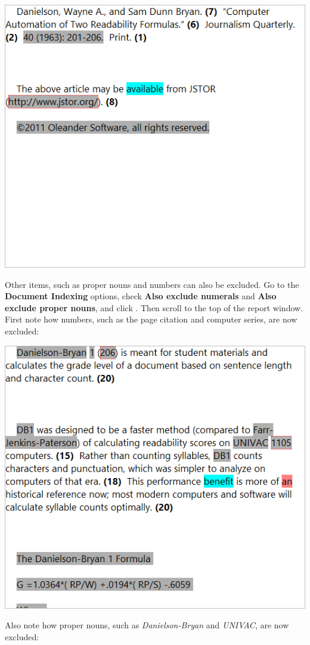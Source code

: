 \documentclass[
]{book}
\theoremstyle{definition}
\theoremstyle{definition}
\theoremstyle{definition}
\theoremstyle{definition}
\theoremstyle{remark}
\begin{document}
\begin{center}\includegraphics[width=0.75\linewidth,]{Images/ExclusionExampleUrlExcludedNow} \end{center}

Other items, such as proper nouns and numbers can also be excluded. Go to the \textbf{Document Indexing} options, check \textbf{Also exclude numerals} and \textbf{Also exclude proper nouns}, and click . Then scroll to the top of the report window. First note how numbers, such as the page citation and computer series, are now excluded:

\begin{center}\includegraphics[width=0.75\linewidth,]{Images/ExclusionExampleNumbersExcludedNow} \end{center}

Also note how proper nouns, such as \emph{Danielson-Bryan} and \emph{UNIVAC}, are now excluded:
\end{document}
